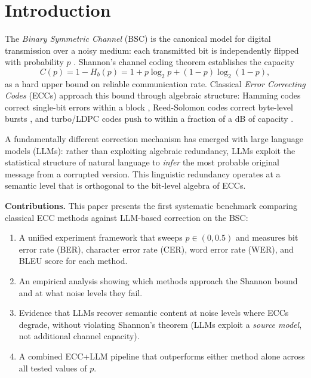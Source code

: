 \section{Introduction}
\label{sec:intro}

The \emph{Binary Symmetric Channel} (BSC) is the canonical model for digital
transmission over a noisy medium: each transmitted bit is independently flipped
with probability $p$ \cite{shannon1948}. Shannon's channel coding theorem
establishes the capacity
\begin{equation}
  C(p) = 1 - H_b(p) = 1 + p\log_2 p + (1-p)\log_2(1-p),
\end{equation}
as a hard upper bound on reliable communication rate.  Classical \emph{Error
Correcting Codes} (ECCs) approach this bound through algebraic structure:
Hamming codes correct single-bit errors within a block \cite{hamming1950},
Reed-Solomon codes correct byte-level bursts \cite{reed_solomon1960}, and
turbo/LDPC codes push to within a fraction of a dB of capacity
\cite{berrou1993,gallager1962}.

A fundamentally different correction mechanism has emerged with large language
models (LLMs): rather than exploiting algebraic redundancy, LLMs exploit the
statistical structure of natural language to \emph{infer} the most probable
original message from a corrupted version.  This linguistic redundancy operates
at a semantic level that is orthogonal to the bit-level algebra of ECCs.

\textbf{Contributions.}  This paper presents the first systematic benchmark
comparing classical ECC methods against LLM-based correction on the BSC:
\begin{enumerate}
  \item A unified experiment framework that sweeps $p \in (0, 0.5)$ and
        measures bit error rate (BER), character error rate (CER), word error
        rate (WER), and BLEU score for each method.
  \item An empirical analysis showing which methods approach the Shannon bound
        and at what noise levels they fail.
  \item Evidence that LLMs recover semantic content at noise levels where ECCs
        degrade, without violating Shannon's theorem (LLMs exploit a \emph{source
        model}, not additional channel capacity).
  \item A combined ECC+LLM pipeline that outperforms either method alone across
        all tested values of $p$.
\end{enumerate}
